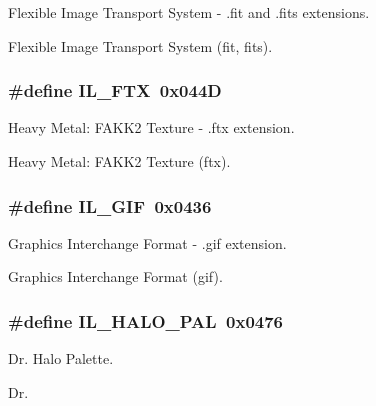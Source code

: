 Flexible Image Transport System -\/ .fit and .fits extensions. 

Flexible Image Transport System (fit, fits). \hypertarget{group__il__formats_ga8f0ebc84a1bad958e92132d24efd18d1}{
\subsubsection[{I\+L\+\_\+\+F\+T\+X}]{\setlength{\rightskip}{0pt plus 5cm}\#define I\+L\+\_\+\+F\+T\+X~0x044\+D}}\label{group__il__formats_ga8f0ebc84a1bad958e92132d24efd18d1}


Heavy Metal\+: F\+A\+K\+K2 Texture -\/ .ftx extension. 

Heavy Metal\+: F\+A\+K\+K2 Texture (ftx). \hypertarget{group__il__formats_gae5b5796118e89d8f9a4badea54dad9b2}{
\subsubsection[{I\+L\+\_\+\+G\+I\+F}]{\setlength{\rightskip}{0pt plus 5cm}\#define I\+L\+\_\+\+G\+I\+F~0x0436}}\label{group__il__formats_gae5b5796118e89d8f9a4badea54dad9b2}


Graphics Interchange Format -\/ .gif extension. 

Graphics Interchange Format (gif). \hypertarget{group__il__formats_ga1d151c60416a04d1b13823cd7c94161f}{
\subsubsection[{I\+L\+\_\+\+H\+A\+L\+O\+\_\+\+P\+A\+L}]{\setlength{\rightskip}{0pt plus 5cm}\#define I\+L\+\_\+\+H\+A\+L\+O\+\_\+\+P\+A\+L~0x0476}}\label{group__il__formats_ga1d151c60416a04d1b13823cd7c94161f}


Dr. Halo Palette. 

Dr.

